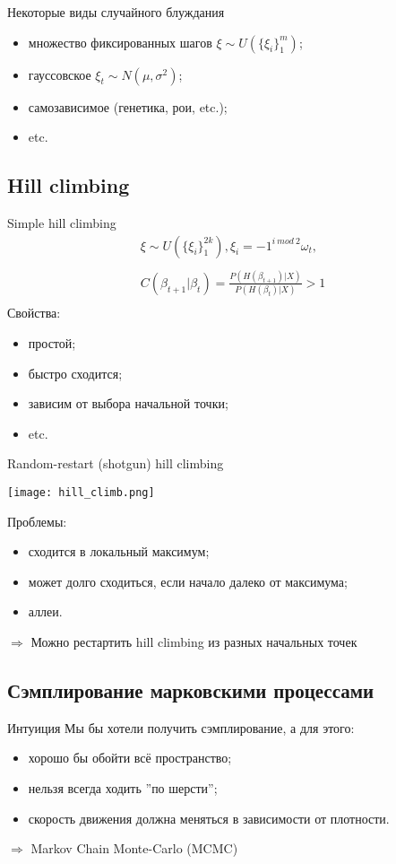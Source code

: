 \documentclass[14pt, fleqn, xcolor={dvipsnames, table}]{beamer}
\begin{document}
\begin{frame}{Некоторые виды случайного блуждания}
\begin{itemize}
  \item множество фиксированных шагов $\xi \sim U(\{\xi_i\}_1^m)$;
  \item гауссовское $\xi_t \sim N(\mu, \sigma^2)$;
  \item самозависимое (генетика, рои, etc.);
  \item etc.
\end{itemize}
\end{frame}

\subsection{Hill climbing}
\begin{frame}{Simple hill climbing}
$$\begin{array}{l}
\xi \sim U(\{\xi_i\}_1^{2k}), \xi_{i} = -1^{i~mod~2}\omega_t,\\
\\
C(\beta_{t+1}|\beta_t) = \frac{P(H(\beta_{t+1})|X)}{P(H(\beta_t)|X)} > 1 \\
\end{array}$$
Свойства:
\begin{itemize}
  \item простой;
  \item быстро сходится;
  \item зависим от выбора начальной точки;
  \item etc.
\end{itemize}
\end{frame}

\begin{frame}{Random-restart (shotgun) hill climbing}
\begin{center}
\texttt{[image: hill\_climb.png]}
\end{center}
\footnotesize
Проблемы:
\begin{itemize}
  \item сходится в локальный максимум;
  \item может долго сходиться, если начало далеко от максимума;
  \item аллеи.
\end{itemize}
$\Rightarrow$ Можно рестартить hill climbing из разных начальных точек
\end{frame}

\subsection{Сэмплирование марковскими процессами}
\begin{frame}{Интуиция}
Мы бы хотели получить сэмплирование, а для этого:
\begin{itemize}
  \item хорошо бы обойти всё пространство;
  \item нельзя всегда ходить ''по шерсти'';
  \item скорость движения должна меняться в зависимости от плотности.
\end{itemize}
$\Rightarrow$ Markov Chain Monte-Carlo (MCMC)
\end{frame}
\end{document}
